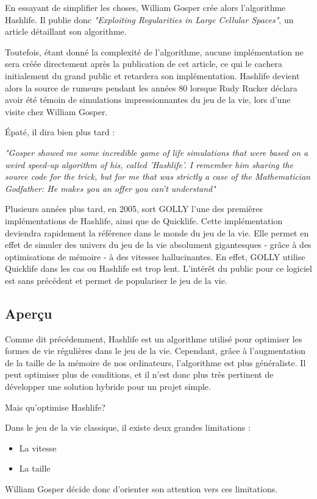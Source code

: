 En essayant de simplifier les choses, William Gosper crée alors l'algorithme Hashlife. Il publie donc \textit{"Exploiting Regularities in Large Cellular Spaces"}, un article détaillant son algorithme.

Toutefois, étant donné la complexité de l'algorithme, aucune implémentation ne sera créée directement après la publication de cet article, ce qui le cachera initialement du grand public et retardera son implémentation. Hashlife devient alors la source de rumeurs pendant les années 80 lorsque Rudy Rucker déclara avoir été témoin de simulations impressionnantes du jeu de la
vie, lors d'une visite chez William Gosper. 

Épaté, il dira bien plus tard : 

\textit{"Gosper showed me some incredible game of life simulations that were based on a weird speed-up algorithm of his, called 'Hashlife'. I remember him sharing the source code for the trick, but for me that was strictly a case of the Mathematician Godfather: He makes you an offer you can't understand"}

Plusieurs années plus tard, en 2005, sort GOLLY l'une des premières implémentations de Hashlife, ainsi que de Quicklife. Cette implémentation deviendra rapidement la référence dans le monde du jeu de la vie. Elle permet en effet de simuler des univers du jeu de la vie absolument gigantesques - grâce à des optimisations de mémoire - à des vitesses hallucinantes. En effet, GOLLY utilise Quicklife dans les cas ou Hashlife est trop lent. L'intérêt du public pour ce logiciel est sans précédent et permet de populariser le jeu de la vie.

\subsection{Aperçu}
Comme dit précédemment, Hashlife est un algorithme utilisé pour optimiser les formes de vie régulières dans le jeu de la vie. Cependant, grâce à l'augmentation de la taille de la mémoire de nos ordinateurs, l'algorithme est plus généraliste. Il peut optimiser plus de conditions, et il n'est donc plus très pertinent de développer une solution hybride pour un projet simple.

Mais qu'optimise Hashlife?

Dans le jeu de la vie classique, il existe deux grandes limitations :
\begin{itemize}
\item{La vitesse}
\item{La taille}
\end{itemize}
William Gosper décide donc d'orienter son attention vers ces limitations.

